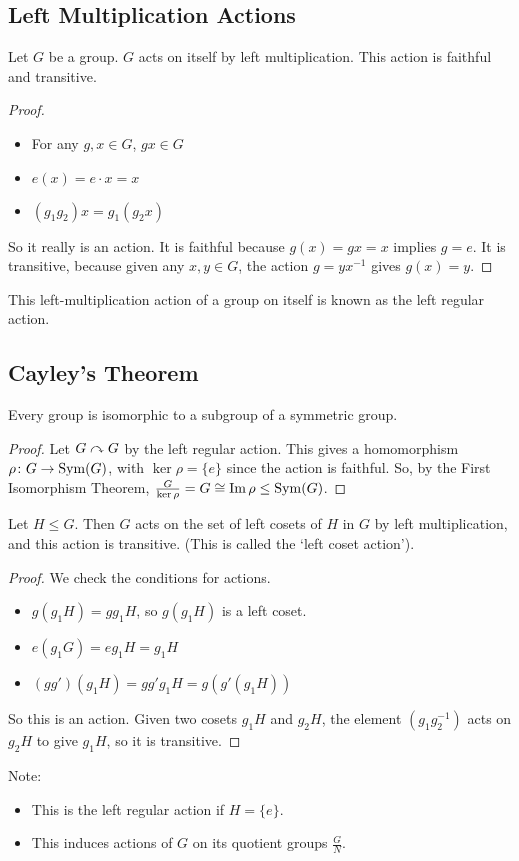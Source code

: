 \subsection{Left Multiplication Actions}
\begin{lemma}
	Let $G$ be a group. $G$ acts on itself by left multiplication. This action is faithful and transitive.
\end{lemma}
\begin{proof}
	\begin{itemize}
		\item For any $g, x \in G$, $gx \in G$
		\item $e(x) = e \cdot x = x$
		\item $(g_1 g_2) x = g_1 (g_2 x)$
	\end{itemize}
	So it really is an action. It is faithful because $g(x) = gx = x$ implies $g = e$. It is transitive, because given any $x, y \in G$, the action $g = yx^{-1}$ gives $g(x) = y$.
\end{proof}
\begin{definition}
	This left-multiplication action of a group on itself is known as the left regular action.
\end{definition}

\subsection{Cayley's Theorem}
\begin{theorem}
	Every group is isomorphic to a subgroup of a symmetric group.
\end{theorem}
\begin{proof}
	Let $G \curvearrowright G$ by the left regular action. This gives a homomorphism $\rho\colon G \to \operatorname{Sym}(G)$, with $\ker \rho = \{ e \}$ since the action is faithful. So, by the First Isomorphism Theorem, $\frac{G}{\ker \rho} = G \cong \Im \rho \leq \operatorname{Sym}(G)$.
\end{proof}

\begin{proposition}
	Let $H \leq G$. Then $G$ acts on the set of left cosets of $H$ in $G$ by left multiplication, and this action is transitive. (This is called the `left coset action').
\end{proposition}
\begin{proof}
	We check the conditions for actions.
	\begin{itemize}
		\item $g(g_1H) = gg_1H$, so $g(g_1H)$ is a left coset.
		\item $e(g_1G) = eg_1H = g_1H$
		\item $(gg')(g_1H) = gg'g_1H = g(g'(g_1H))$
	\end{itemize}
	So this is an action. Given two cosets $g_1H$ and $g_2H$, the element $(g_1g_2^{-1})$ acts on $g_2H$ to give $g_1H$, so it is transitive.
\end{proof}
Note:
\begin{itemize}
	\item This is the left regular action if $H = \{ e \}$.
	\item This induces actions of $G$ on its quotient groups $\frac{G}{N}$.
\end{itemize}

